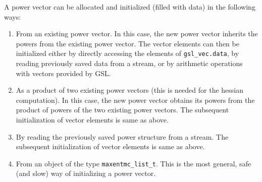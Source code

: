 \documentclass[12pt]{amsart}
\numberwithin{equation}{section}
\begin{document}
A power vector can be allocated and initialized (filled with data) in
the following ways:
%
\begin{enumerate}[1.]
\item From an existing power vector. In this case, the new power
  vector inherits the powers from the existing power vector. The
  vector elements can then be initialized either by directly accessing
  the elements of \texttt{gsl\_vec.data}, by reading previously saved
  data from a stream, or by arithmetic operations with vectors
  provided by GSL.
\item As a product of two existing power vectors (this is needed for
  the hessian computation). In this case, the new power vector obtains
  its powers from the product of powers of the two existing power
  vectors. The subsequent initialization of vector elements is same as
  above.
\item By reading the previously saved power structure from a stream.
  The subsequent initialization of vector elements is same as above.
\item From an object of the type \texttt{maxentmc\_list\_t}. This is
  the most general, safe (and slow) way of initializing a power
  vector.
\end{enumerate}
\end{document}
